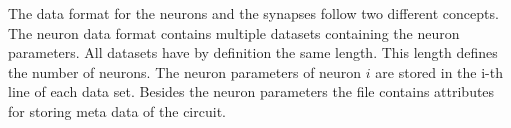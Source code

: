 The data format for the neurons and the synapses follow two different concepts.
The neuron data format contains multiple datasets containing the neuron parameters.
All datasets have by definition the same length. This length defines the number of neurons.
The neuron parameters of neuron $i$ are stored in the i-th line of each data set.
Besides the neuron parameters the file contains attributes for storing meta data of the circuit.
\begin{figure}[ht!]
   	\begin{center}
        \hspace{1cm}
\end{center}
\end{figure}
